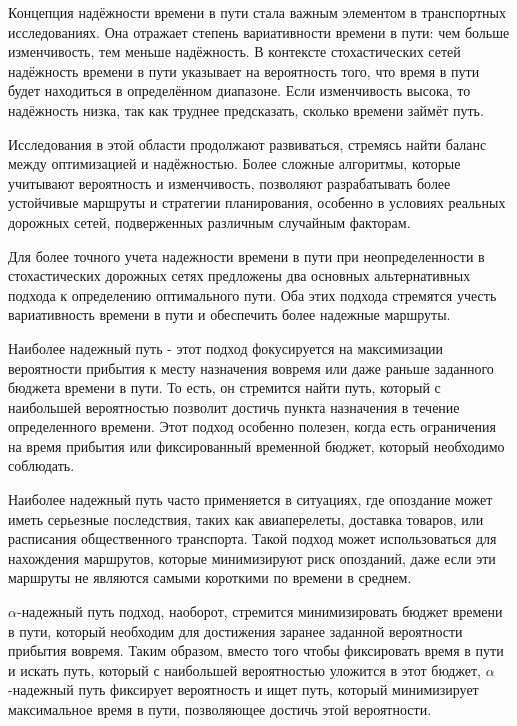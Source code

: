 Концепция надёжности времени в пути стала важным элементом в транспортных исследованиях. Она отражает степень вариативности времени в пути: чем больше изменчивость, тем меньше надёжность. В контексте стохастических сетей надёжность времени в пути указывает на вероятность того, что время в пути будет находиться в определённом диапазоне. Если изменчивость высока, то надёжность низка, так как труднее предсказать, сколько времени займёт путь.

Исследования в этой области продолжают развиваться, стремясь найти баланс между оптимизацией и надёжностью. Более сложные алгоритмы, которые учитывают вероятность и изменчивость, позволяют разрабатывать более устойчивые маршруты и стратегии планирования, особенно в условиях реальных дорожных сетей, подверженных различным случайным факторам.






Для более точного учета надежности времени в пути при неопределенности в стохастических дорожных сетях предложены два основных альтернативных подхода к определению оптимального пути. Оба этих подхода стремятся учесть вариативность времени в пути и обеспечить более надежные маршруты.

Наиболее надежный путь - этот подход фокусируется на максимизации вероятности прибытия к месту назначения вовремя или даже раньше заданного бюджета времени в пути. То есть, он стремится найти путь, который с наибольшей вероятностью позволит достичь пункта назначения в течение определенного времени. Этот подход особенно полезен, когда есть ограничения на время прибытия или фиксированный временной бюджет, который необходимо соблюдать.

Наиболее надежный путь часто применяется в ситуациях, где опоздание может иметь серьезные последствия, таких как авиаперелеты, доставка товаров, или расписания общественного транспорта. Такой подход может использоваться для нахождения маршрутов, которые минимизируют риск опозданий, даже если эти маршруты не являются самыми короткими по времени в среднем.

$\alpha$-надежный путь подход, наоборот, стремится минимизировать бюджет времени в пути, который необходим для достижения заранее заданной вероятности прибытия вовремя. Таким образом, вместо того чтобы фиксировать время в пути и искать путь, который с наибольшей вероятностью уложится в этот бюджет, $\alpha$-надежный путь фиксирует вероятность и ищет путь, который минимизирует максимальное время в пути, позволяющее достичь этой вероятности.

